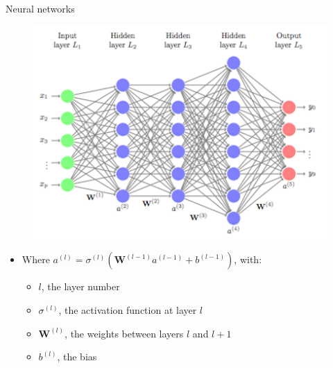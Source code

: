 \documentclass{beamer}
\newcommand{\matr}[1]{\bm{#1}}     %
\begin{document}
\begin{frame}{Neural networks}

\begin{figure}
    \centering
    \includegraphics[scale=0.4]{images/neuralnetwork.png}
    \label{fig:nn}
\end{figure}
    
\begin{itemize}
    \item Where $a^{(l)} = \sigma^{(l)}(\matr{W}^{(l-1)} a^{(l-1)} + b^{(l-1)})$, with:
    \begin{itemize}
        \item $l$, the layer number
        \item $\sigma^(l)$, the activation function at layer $l$
        \item $\matr{W}^(l)$, the weights between layers $l$ and $l+1$
        \item $b^{(l)}$, the bias
    \end{itemize}
\end{itemize}
    
\end{frame}
\end{document}
